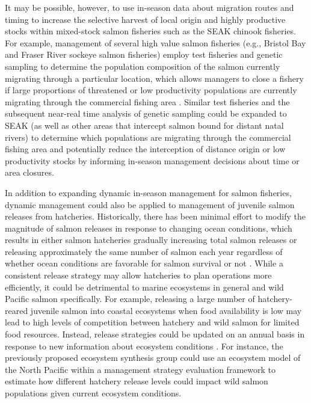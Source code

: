 It may be possible, however, to use in-season data about migration routes and
timing to increase the selective harvest of local origin and highly productive
stocks within mixed-stock salmon fisheries such as the SEAK chinook fisheries.
For example, management of several high value salmon fisheries (e.g., Bristol
Bay and Fraser River sockeye salmon fisheries) employ test fisheries and genetic
sampling to determine the population composition of the salmon currently
migrating through a particular location, which allows managers to close a
fishery if large proportions of threatened or low productivity populations are
currently migrating through the commercial fishing area \citep{Dann2013}.
Similar test fisheries and the subsequent near-real time analysis of genetic
sampling could be expanded to SEAK (as well as other areas that intercept salmon
bound for distant natal rivers) to determine which populations are migrating
through the commercial fishing area and potentially reduce the interception of
distance origin or low productivity stocks by informing in-season management
decisions about time or area closures.

In addition to expanding dynamic in-season management for salmon fisheries,
dynamic management could also be applied to management of juvenile salmon
releases from hatcheries. Historically, there has been minimal effort to modify
the magnitude of salmon releases in response to changing ocean conditions, which
results in either salmon hatcheries gradually increasing total salmon releases
or releasing approximately the same number of salmon each year regardless of
whether ocean conditions are favorable for salmon survival or not
\citep{Pearsons2010a}. While a consistent release strategy may allow hatcheries
to plan operations more efficiently, it could be detrimental to marine
ecosystems in general and wild Pacific salmon specifically. For example,
releasing a large number of hatchery-reared juvenile salmon into coastal
ecosystems when food availability is low may lead to high levels of competition
between hatchery and wild salmon for limited food resources. Instead, release
strategies could be updated on an annual basis in response to new information
about ecosystem conditions \citep{Pearsons2010a, Peterman1983a}. For instance,
the previously proposed ecosystem synthesis group could use an ecosystem model
of the North Pacific within a management strategy evaluation framework to
estimate how different hatchery release levels could impact wild salmon
populations given current ecosystem conditions.



